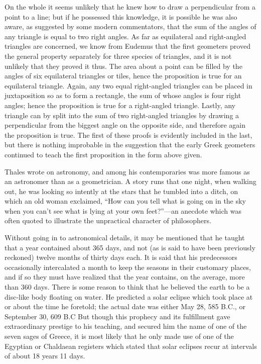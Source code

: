 \documentclass[12pt,oneside]{book}
\begin{document}
On the whole it seems unlikely that he knew how to draw a perpendicular from a point to a line; but if he possessed this knowledge, it is possible he was also aware, as suggested by some modern commentators, that the sum of the angles of any triangle is equal to two right angles. As far as equilateral and right-angled triangles are concerned, we know from Eudemus that the first geometers proved the general property separately for three species of triangles, and it is not unlikely that they proved it thus. The area about a point can be filled by the angles of six equilateral triangles or tiles, hence the proposition is true for an equilateral triangle. Again, any two equal right-angled triangles can be placed in juxtaposition so as to form a rectangle, the sum of whose angles is four right angles; hence the proposition is true for a right-angled triangle. Lastly, any triangle can by split into the sum of two right-angled triangles by drawing a perpendicular from the biggest angle on the opposite side, and therefore again the proposition is true. The first of these proofs is evidently included in the last, but there is nothing improbable in the suggestion that the early Greek geometers continued to teach the first proposition in the form above given. \par 

Thales wrote on astronomy, and among his contemporaries was more famous as an astronomer than as a geometrician. A story runs that one night, when walking out, he was looking so intently at the stars that he tumbled into a ditch, on which an old woman exclaimed, ``How can you tell what is going on in the sky when you can't see what is lying at your own feet?''---an anecdote which was often quoted to illustrate the unpractical character of philosophers. \par 

Without going in to astronomical details, it may be mentioned that he taught that a year contained about 365 days, and not (as is said to have been previously reckoned) twelve months of thirty days each. It is said that his predecessors occasionally intercalated a month to keep the seasons in their customary places, and if so they must have realized that the year contains, on the average, more than 360 days. There is some reason to think that he believed the earth to be a disc-like body floating on water. He predicted a solar eclipse which took place at or about the time he foretold; the actual date was either May 28, 585 B.C., or September 30, 609 B.C But though this prophecy and its fulfillment gave extraordinary prestige to his teaching, and secured him the name of one of the seven sages of Greece, it is most likely that he only made use of one of the Egyptian or Chaldaean registers which stated that solar eclipses recur at intervals of about 18 years 11 days. \par 
\end{document}
